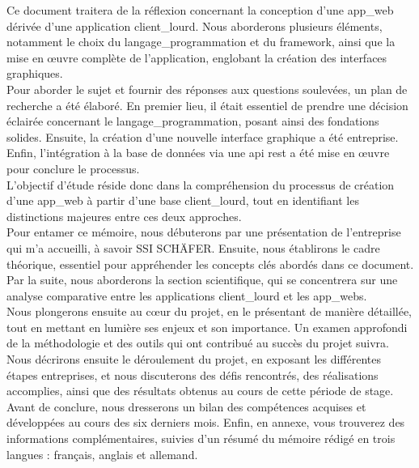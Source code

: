 \documentclass[a4paper, 12pt, french]{article}
\begin{document}
			Ce document traitera de la réflexion concernant la conception d'une \gls{app_web} dérivée d'une application \gls{client_lourd}. Nous aborderons plusieurs éléments, notamment le choix du \gls{langage_programmation} et du \gls{framework}, ainsi que la mise en œuvre complète de l'application, englobant la création des interfaces graphiques.\\
			
			Pour aborder le sujet et fournir des réponses aux questions soulevées, un plan de recherche a été élaboré. En premier lieu, il était essentiel de prendre une décision éclairée concernant le \gls{langage_programmation}, posant ainsi des fondations solides. Ensuite, la création d'une nouvelle interface graphique a été entreprise. Enfin, l'intégration à la base de données via une \acrshort{api} \acrshort{rest} a été mise en œuvre pour conclure le processus.\\
			
			L'objectif d'étude réside donc dans la compréhension du processus de création d'une \gls{app_web} à partir d'une base \gls{client_lourd}, tout en identifiant les distinctions majeures entre ces deux approches.\\
			
			Pour entamer ce mémoire, nous débuterons par une présentation de l'entreprise qui m'a accueilli, à savoir SSI SCHÄFER. Ensuite, nous établirons le cadre théorique, essentiel pour appréhender les concepts clés abordés dans ce document. Par la suite, nous aborderons la section scientifique, qui se concentrera sur une analyse comparative entre les applications \gls{client_lourd} et les \glspl{app_web}.\\
	
			Nous plongerons ensuite au cœur du projet, en le présentant de manière détaillée, tout en mettant en lumière ses enjeux et son importance. Un examen approfondi de la méthodologie et des outils qui ont contribué au succès du projet suivra. Nous décrirons ensuite le déroulement du projet, en exposant les différentes étapes entreprises, et nous discuterons des défis rencontrés, des réalisations accomplies, ainsi que des résultats obtenus au cours de cette période de stage.\\
	
			Avant de conclure, nous dresserons un bilan des compétences acquises et développées au cours des six derniers mois. Enfin, en annexe, vous trouverez des informations complémentaires, suivies d'un résumé du mémoire rédigé en trois langues : français, anglais et allemand.
\end{document}
